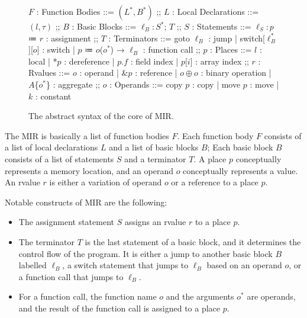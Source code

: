 \documentclass[en]{snu-ece-bsc-thesis}
\theoremstyle{definition}
\begin{document}
\begin{figure}[tbh]
  \begin{center}
    \begin{bnf}[
      colspec = {lrcll},
      column{4} = {mode=text, font=\ttfamily},
    ]
      $F$ : Function Bodies ::=
        $(L^*, B^*)$
    ;;
      $L$ : Local Declarations ::=
        $(l, \tau)$
    ;;
      $B$ : Basic Blocks ::=
        $\ell_B\colon S^*$; $T$
    ;;
      $S$ : Statements ::=
        $\ell_S\colon p$ ≔ $r$ : assignment
    ;;
      $T$ : Terminators ::=
        goto $\ell_B$ : jump
      | switch[$\ell_B^*$][$o$] : switch
      | $p$ ≔ $o$($o^*$) → $\ell_B$ : function call
    ;;
      $p$ : Places ::=
        $l$ : local
      | *$p$ : dereference
      | $p$.$f$ : field index
      | $p$[$i$] : array index
    ;;
      $r$ : Rvalues ::=
        $o$ : operand
      | \&$p$ : reference
      | $o \oplus o$ : binary operation
      | $A$\{$o^*$\} : aggregate
    ;;
      $o$ : Operands ::=
        copy $p$ : copy
      | move $p$ : move
      | $k$ : constant
    \end{bnf}
  \end{center}
  \caption{The abstract syntax of the core of MIR.}\label{fig:mir}
\end{figure}

The MIR is basically a list of function bodies $F$.
Each function body $F$ consists of a list of local declarations $L$ and a list of basic blocks $B$;
Each basic block $B$ consists of a list of statements $S$ and a terminator $T$.
A place $p$ conceptually represents a memory location, and an operand $o$ conceptually represents a value.
An rvalue $r$ is either a variation of operand $o$ or a reference to a place $p$.

Notable constructs of MIR are the following:
\begin{itemize}
  \item The assignment statement $S$ assigns an rvalue $r$ to a place $p$.
  \item The terminator $T$ is the last statement of a basic block, and it determines the control flow of the program.
    It is either a jump to another basic block $B$ labelled $\ell_B$, a switch statement that jumps to $\ell_B$ based on an operand $o$, or a function call that jumps to $\ell_B$.
  \item For a function call, the function name $o$ and the arguments $o^*$ are operands, and the result of the function call is assigned to a place $p$.
\end{itemize}
\end{document}
